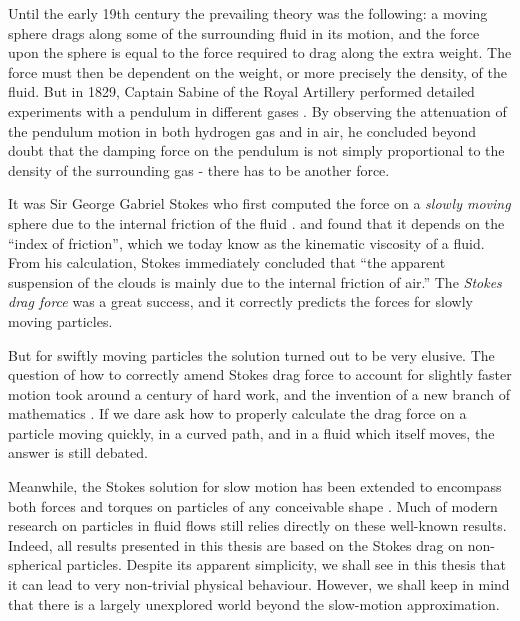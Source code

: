 \documentclass[thesis.tex]{subfiles}
\begin{document}
Until the early 19th century the prevailing theory was the following: a moving sphere drags along some of the surrounding fluid in its motion, and the force upon the sphere is equal to the force required to drag along the extra weight. The force must then be dependent on the weight, or more precisely the density, of the fluid. But in 1829, Captain Sabine of the Royal Artillery performed detailed experiments with a pendulum in different gases \cite{sabine1829}. By observing the attenuation of the pendulum motion in both hydrogen gas and in air, he concluded beyond doubt that the damping force on the pendulum is not simply proportional to the density of the surrounding gas - there has to be another force.

It was Sir George Gabriel Stokes who first computed the force on a \emph{slowly moving
} sphere due to the internal friction of the fluid \cite{stokes1851}. and found that it depends on the ``index of friction'', which we today know as the kinematic viscosity of a fluid. From his calculation, Stokes immediately concluded that ``the apparent suspension of the clouds is mainly due to the internal friction of air.'' 
The \emph{Stokes drag force} was a great success, and it correctly predicts the forces for slowly moving particles.

But for swiftly moving particles
the solution turned out to be very elusive. The question of how to correctly amend Stokes drag force to account for slightly faster motion took around a century of hard work, and the invention of a new branch of mathematics \cite{veysey2007}. If we dare ask how to properly calculate the drag force on a particle moving quickly, in a curved path, and in a fluid which itself moves, the answer is still debated.

Meanwhile, the Stokes solution for slow motion has been extended to encompass both forces and torques on particles of any conceivable shape \cite{jeffery1922,brenner1974,kim1991}. Much of modern research on particles in fluid flows still relies directly on these well-known results. Indeed, all results presented in this thesis are based on the Stokes drag on non-spherical particles. Despite its apparent simplicity, we shall see in this thesis that it can lead to very non-trivial physical behaviour. However, we shall keep in mind that there is a largely unexplored world beyond the slow-motion approximation.
\end{document}
